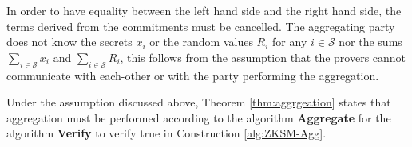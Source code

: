 
In order to have equality between the left hand side and the right hand side, the terms derived from the commitments must be cancelled. The aggregating party does not know the secrets $x_i$ or the random values $R_i$ for any $i\in\mathcal{S}$ nor the sums $\sum_{i\in\mathcal{S}} x_i$ and $\sum_{i\in\mathcal{S}} R_i$, this follows from the assumption that the provers cannot communicate with each-other or with the party performing the aggregation. 

Under the assumption discussed above, Theorem \ref{thm:aggrgeation} states that aggregation must be performed according to the algorithm \textbf{Aggregate} for the algorithm \textbf{Verify} to verify true in Construction \ref{alg:ZKSM-Agg}. 



